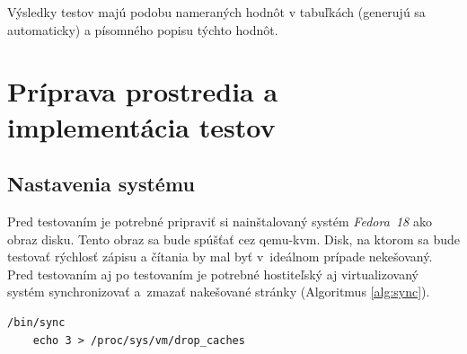 Výsledky testov majú podobu nameraných hodnôt v tabuľkách (generujú sa
automaticky) a písomného popisu týchto hodnôt.


%
%

\chapter{Príprava prostredia a implementácia testov}

\section{Nastavenia systému}

Pred testovaním je potrebné pripraviť si nainštalovaný systém \emph{Fedora~18}
ako obraz disku. Tento obraz sa bude spúšťať cez qemu-kvm. Disk, na ktorom sa
bude testovať rýchlosť zápisu a čítania by mal byť v~ideálnom prípade
nekešovaný.  Pred testovaním aj po testovaním je potrebné hostiteľský aj
virtualizovaný systém synchronizovať a~zmazať nakešované stránky (Algoritmus
\ref{alg:sync}).
\\
\begin{lstlisting}[caption=Synchronizácia systému,label=alg:sync]
    /bin/sync
    echo 3 > /proc/sys/vm/drop_caches
\end{lstlisting}

